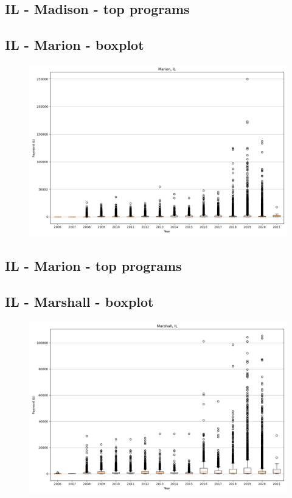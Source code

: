 \subsection*{IL - Madison - top programs}

\newpage
\subsection*{IL - Marion - boxplot}
\begin{figure}[h]
\centering
\includegraphics[width=7in]{../output/boxplots/counties/Marion-IL_boxplot.png}
\end{figure}


\subsection*{IL - Marion - top programs}

\newpage
\subsection*{IL - Marshall - boxplot}
\begin{figure}[h]
\centering
\includegraphics[width=7in]{../output/boxplots/counties/Marshall-IL_boxplot.png}
\end{figure}


